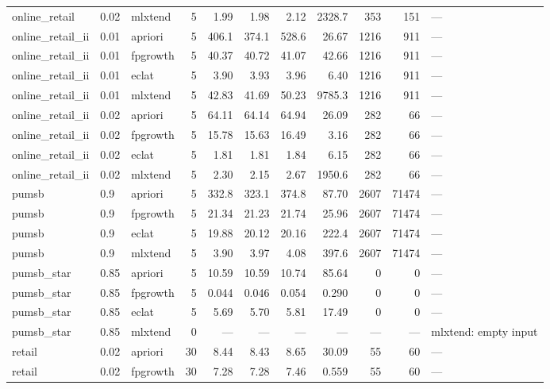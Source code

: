 \documentclass[twocolumn,10pt]{article}
\begin{document}
\begin{longtable}{p{3.0cm}llrrrrrrrp{2.4cm}}
online\_\allowbreak{}retail & 0.02 & mlxtend & 5 & 1.99 & 1.98 & 2.12 & 2328.7 & 353 & 151 & --- \\
online\_\allowbreak{}retail\_\allowbreak{}ii & 0.01 & apriori & 5 & 406.1 & 374.1 & 528.6 & 26.67 & 1216 & 911 & --- \\
online\_\allowbreak{}retail\_\allowbreak{}ii & 0.01 & fpgrowth & 5 & 40.37 & 40.72 & 41.07 & 42.66 & 1216 & 911 & --- \\
online\_\allowbreak{}retail\_\allowbreak{}ii & 0.01 & eclat & 5 & 3.90 & 3.93 & 3.96 & 6.40 & 1216 & 911 & --- \\
online\_\allowbreak{}retail\_\allowbreak{}ii & 0.01 & mlxtend & 5 & 42.83 & 41.69 & 50.23 & 9785.3 & 1216 & 911 & --- \\
online\_\allowbreak{}retail\_\allowbreak{}ii & 0.02 & apriori & 5 & 64.11 & 64.14 & 64.94 & 26.09 & 282 & 66 & --- \\
online\_\allowbreak{}retail\_\allowbreak{}ii & 0.02 & fpgrowth & 5 & 15.78 & 15.63 & 16.49 & 3.16 & 282 & 66 & --- \\
online\_\allowbreak{}retail\_\allowbreak{}ii & 0.02 & eclat & 5 & 1.81 & 1.81 & 1.84 & 6.15 & 282 & 66 & --- \\
online\_\allowbreak{}retail\_\allowbreak{}ii & 0.02 & mlxtend & 5 & 2.30 & 2.15 & 2.67 & 1950.6 & 282 & 66 & --- \\
pumsb & 0.9 & apriori & 5 & 332.8 & 323.1 & 374.8 & 87.70 & 2607 & 71474 & --- \\
pumsb & 0.9 & fpgrowth & 5 & 21.34 & 21.23 & 21.74 & 25.96 & 2607 & 71474 & --- \\
pumsb & 0.9 & eclat & 5 & 19.88 & 20.12 & 20.16 & 222.4 & 2607 & 71474 & --- \\
pumsb & 0.9 & mlxtend & 5 & 3.90 & 3.97 & 4.08 & 397.6 & 2607 & 71474 & --- \\
pumsb\_\allowbreak{}star & 0.85 & apriori & 5 & 10.59 & 10.59 & 10.74 & 85.64 & 0 & 0 & --- \\
pumsb\_\allowbreak{}star & 0.85 & fpgrowth & 5 & 0.044 & 0.046 & 0.054 & 0.290 & 0 & 0 & --- \\
pumsb\_\allowbreak{}star & 0.85 & eclat & 5 & 5.69 & 5.70 & 5.81 & 17.49 & 0 & 0 & --- \\
pumsb\_\allowbreak{}star & 0.85 & mlxtend & 0 & --- & --- & --- & --- & --- & --- & mlxtend: empty input \\
retail & 0.02 & apriori & 30 & 8.44 & 8.43 & 8.65 & 30.09 & 55 & 60 & --- \\
retail & 0.02 & fpgrowth & 30 & 7.28 & 7.28 & 7.46 & 0.559 & 55 & 60 & --- \\

\end{longtable}
\end{document}

